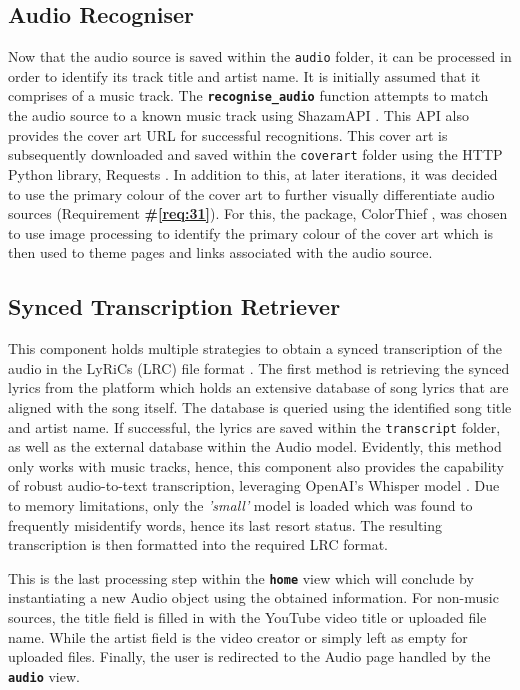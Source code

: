 \documentclass{l4proj}
\begin{document}
\subsection{Audio Recogniser}
Now that the audio source is saved within the \lstinline|audio| folder, it can be processed in order to identify its track title and artist name. It is initially assumed that it comprises of a music track. The \textbf{\lstinline|recognise_audio|} function attempts to match the audio source to a known music track using ShazamAPI \citep{shazamapi}. This API also provides the cover art URL for successful recognitions. This cover art is subsequently downloaded and saved within the \lstinline|coverart| folder using the HTTP Python library, Requests \citep{requests}. In addition to this, at later iterations, it was decided to use the primary colour of the cover art to further visually differentiate audio sources (Requirement \textbf{\#\ref{req:31}}). For this, the package, ColorThief \citep{colorthief}, was chosen to use image processing to identify the primary colour of the cover art which is then used to theme pages and links associated with the audio source.


\subsection{Synced Transcription Retriever}
This component holds multiple strategies to obtain a synced transcription of the audio in the LyRiCs (LRC) file format \citep{lrc}. The first method is retrieving the synced lyrics from the \cite{musixmatch} platform which holds an extensive database of song lyrics that are aligned with the song itself. The database is queried using the identified song title and artist name. If successful, the lyrics are saved within the \lstinline|transcript| folder, as well as the external database within the Audio model. Evidently, this method only works with music tracks, hence, this component also provides the capability of robust audio-to-text transcription, leveraging OpenAI's Whisper model \citep{whisper}. Due to memory limitations, only the \emph{'small'} model is loaded which was found to frequently misidentify words, hence its last resort status.  The resulting transcription is then formatted into the required LRC format.

This is the last processing step within the \textbf{\lstinline|home|} view which will conclude by instantiating a new Audio object using the obtained information. For non-music sources, the title field is filled in with the YouTube video title or uploaded file name. While the artist field is the video creator or simply left as empty for uploaded files. Finally, the user is redirected to the Audio page handled by the \textbf{\lstinline|audio|} view.
\end{document}
